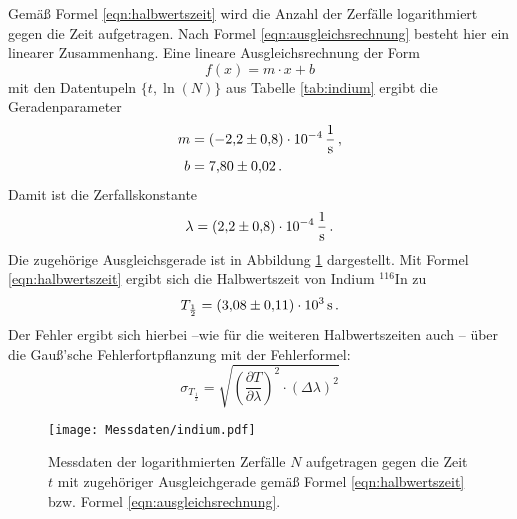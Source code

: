Gemäß Formel \eqref{eqn:halbwertszeit} wird die Anzahl der Zerfälle logarithmiert gegen die Zeit aufgetragen. Nach Formel \eqref{eqn:ausgleichsrechnung} besteht hier ein linearer Zusammenhang.
Eine lineare Ausgleichsrechnung der Form
\begin{equation*}
	f(x) = m \cdot x + b
\end{equation*}
mit den Datentupeln $\{ t, \ln (N)\}$ aus Tabelle \ref{tab:indium} ergibt die Geradenparameter
\begin{align*}
	m &= \SI{-2,2(8)E-04}{\per\second}  \, \mathrm{,} \\
	b &= \num{7,80(2)} \, \mathrm{.}
\end{align*}
Damit ist die Zerfallskonstante
\begin{equation*}
	\lambda = \SI{2,2(8)E-04}{\per\second}  \, \mathrm{.} \\
\end{equation*}
Die zugehörige Ausgleichsgerade ist in Abbildung \ref{fig:indium} dargestellt.
Mit Formel \eqref{eqn:halbwertszeit} ergibt sich die Halbwertszeit von Indium $^{116}\mathrm{In}$
zu
\begin{equation*}
	T_{\frac{1}{2}} =  \SI{3.08(11)E03}{\second} \, \mathrm{.}
\end{equation*}
Der Fehler ergibt sich hierbei --wie für die weiteren Halbwertszeiten auch -- über die Gauß'sche Fehlerfortpflanzung mit der Fehlerformel:
\begin{equation}
	\sigma_{T_{\frac{1}{2}}}=\sqrt{\left(\frac{\partial{T}}{\partial{\lambda}}\right)^2\cdot (\Delta \lambda)^2}
\end{equation}
\begin{figure}
	\centering
	\texttt{[image: Messdaten/indium.pdf]}
	\caption{Messdaten der logarithmierten Zerfälle $N$ aufgetragen gegen die Zeit $t$ mit zugehöriger Ausgleichgerade gemäß Formel \eqref{eqn:halbwertszeit} bzw. Formel \eqref{eqn:ausgleichsrechnung}.}
	\label{fig:indium}
\end{figure}






